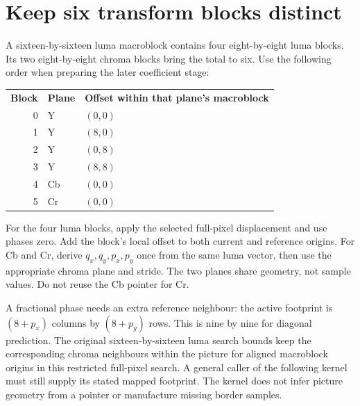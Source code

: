 \section{Keep six transform blocks distinct}
A sixteen-by-sixteen luma macroblock contains four eight-by-eight luma blocks.
Its two eight-by-eight chroma blocks bring the total to six. Use the following
order when preparing the later coefficient stage:
\begin{center}
  \begin{tabular}{rll}
    \textbf{Block} & \textbf{Plane} & \textbf{Offset within that plane's macroblock} \\
    0              & Y              & $(0,0)$                                        \\
    1              & Y              & $(8,0)$                                        \\
    2              & Y              & $(0,8)$                                        \\
    3              & Y              & $(8,8)$                                        \\
    4              & Cb             & $(0,0)$                                        \\
    5              & Cr             & $(0,0)$
  \end{tabular}
\end{center}
For the four luma blocks, apply the selected full-pixel displacement and use
phases zero. Add the block's local offset to both current and reference origins.
For Cb and Cr, derive $q_x,q_y,p_x,p_y$ once from the same luma vector, then use
the appropriate chroma plane and stride. The two planes share geometry, not sample
values. Do not reuse the Cb pointer for Cr.

A fractional phase needs an extra reference neighbour: the active footprint is
$(8+p_x)$ columns by $(8+p_y)$ rows. This is nine by nine for diagonal prediction.
The original sixteen-by-sixteen luma search bounds keep the corresponding chroma
neighbours within the picture for aligned macroblock origins in this restricted
full-pixel search. A general caller of the following kernel must still supply
its stated mapped footprint. The kernel does not infer picture geometry from a
pointer or manufacture missing border samples.
